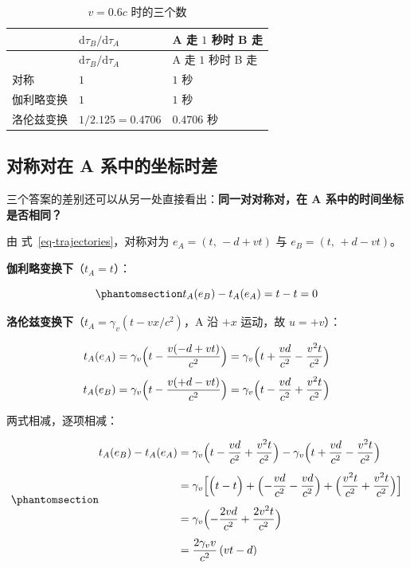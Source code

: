 \documentclass[
  chinese,
  a4paper,
  UTF8,
  12pt,
  oneside,
  openany]{ctexbook}
\theoremstyle{plain}
\theoremstyle{plain}
\theoremstyle{plain}
\theoremstyle{definition}
\theoremstyle{plain}
\theoremstyle{plain}
\theoremstyle{remark}
\begin{document}
\begin{longtable}[]{@{}lll@{}}
\caption{\(v=0.6c\) 时的三个数}\label{tbl-tc-numeric}\tabularnewline
\toprule\noalign{}
& \(\mathrm{d}\tau_B/\mathrm{d}\tau_A\) & A 走 \(1\) 秒时 B 走 \\
\midrule\noalign{}
\endfirsthead
\toprule\noalign{}
& \(\mathrm{d}\tau_B/\mathrm{d}\tau_A\) & A 走 \(1\) 秒时 B 走 \\
\midrule\noalign{}
\endhead
\bottomrule\noalign{}
\endlastfoot
对称 & \(1\) & \(1\) 秒 \\
伽利略变换 & \(1\) & \(1\) 秒 \\
洛伦兹变换 & \(1/2.125=0.4706\) & \(0.4706\) 秒 \\
\end{longtable}

\subsection{对称对在 A
系中的坐标时差}\label{ux5bf9ux79f0ux5bf9ux5728-a-ux7cfbux4e2dux7684ux5750ux6807ux65f6ux5dee}

三个答案的差别还可以从另一处直接看出：\textbf{同一对对称对，在 A
系中的时间坐标是否相同？}

由 式~\ref{eq-trajectories}，对称对为 \(e_A=(t,\,-d+vt)\) 与
\(e_B=(t,\,+d-vt)\)。

\textbf{伽利略变换下}（\(t_A=t\)）：

\begin{equation}\protect\phantomsection\label{eq-tc-diff-G}{
t_A(e_B)-t_A(e_A)=t-t=0
}\end{equation}

\textbf{洛伦兹变换下}（\(t_A=\gamma_v(t-vx/c^{2})\)，A 沿 \(+x\)
运动，故 \(u=+v\)）：

\[
\begin{aligned}
t_A(e_A)&=\gamma_v\Bigl(t-\frac{v(-d+vt)}{c^{2}}\Bigr)=\gamma_v\Bigl(t+\frac{vd}{c^{2}}-\frac{v^{2}t}{c^{2}}\Bigr)\\[4pt]
t_A(e_B)&=\gamma_v\Bigl(t-\frac{v(+d-vt)}{c^{2}}\Bigr)=\gamma_v\Bigl(t-\frac{vd}{c^{2}}+\frac{v^{2}t}{c^{2}}\Bigr)
\end{aligned}
\]

两式相减，逐项相减：

\begin{equation}\protect\phantomsection\label{eq-tc-diff-L}{
\begin{aligned}
t_A(e_B)-t_A(e_A)
&=\gamma_v\Bigl(t-\frac{vd}{c^{2}}+\frac{v^{2}t}{c^{2}}\Bigr)-\gamma_v\Bigl(t+\frac{vd}{c^{2}}-\frac{v^{2}t}{c^{2}}\Bigr)\\[4pt]
&=\gamma_v\Bigl[\Bigl(t-t\Bigr)+\Bigl(-\frac{vd}{c^{2}}-\frac{vd}{c^{2}}\Bigr)+\Bigl(\frac{v^{2}t}{c^{2}}+\frac{v^{2}t}{c^{2}}\Bigr)\Bigr]\\[4pt]
&=\gamma_v\Bigl(-\frac{2vd}{c^{2}}+\frac{2v^{2}t}{c^{2}}\Bigr)\\[4pt]
&=\frac{2\gamma_v v}{c^{2}}\,(vt-d)
\end{aligned}
}\end{equation}
\end{document}
